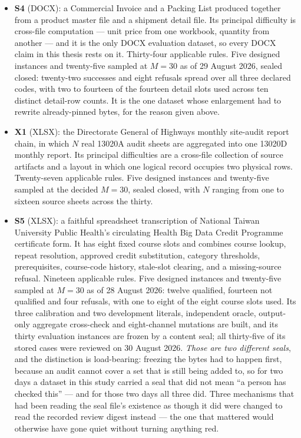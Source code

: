 \begin{itemize}
  \item \textbf{S4} (DOCX): a Commercial Invoice and a Packing List produced together from a
    product master file and a shipment detail file. Its principal difficulty is cross-file
    computation --- unit price from one workbook, quantity from another --- and it is the only
    DOCX evaluation dataset, so every DOCX claim in this thesis rests on it. Thirty-four
    applicable rules. Five designed instances and twenty-five sampled at $M=30$ as of
    29 August 2026, sealed closed: twenty-two successes and eight refusals spread over all
    three declared codes, with two to fourteen of the fourteen detail slots used across ten
    distinct detail-row counts. It is the one dataset whose enlargement had to rewrite
    already-pinned bytes, for the reason given above.
  \item \textbf{X1} (XLSX): the Directorate General of Highways monthly site-audit report
    chain, in which $N$ real 13020A audit sheets are aggregated into one 13020D monthly
    report. Its principal difficulties are a cross-file collection of source artifacts and a
    layout in which one logical record occupies two physical rows. Twenty-seven applicable
    rules. Five designed instances and twenty-five sampled at the decided $M=30$, sealed
    closed, with $N$ ranging from one to sixteen source sheets across the thirty.
  \item \textbf{S5} (XLSX): a faithful spreadsheet transcription of National
    Taiwan University Public Health's circulating Health Big Data Credit Programme
    certificate form. It has eight fixed course slots and combines course lookup, repeat
    resolution, approved credit substitution, category thresholds, prerequisites, course-code
    history, stale-slot clearing, and a missing-source refusal. Nineteen applicable rules.
    Five designed instances and twenty-five sampled at $M=30$ as of 28 August 2026: twelve
    qualified, fourteen not qualified and four refusals, with one to eight of the eight
    course slots used. Its three calibration and two development literals, independent
    oracle, output-only aggregate cross-check and eight-channel mutations are built, and its
    thirty evaluation instances are frozen by a content seal; all thirty-five of its stored
    cases were reviewed on 30 August 2026. \emph{Those are two different seals}, and
    the distinction is load-bearing: freezing the bytes had to happen first, because an audit
    cannot cover a set that is still being added to, so for two days a dataset in this study
    carried a seal that did not mean ``a person has checked this'' --- and for those two days
    all three did. Three mechanisms that had been reading the seal file's
    existence as though it did were changed to read the recorded review digest instead ---
    the one that mattered would otherwise have gone quiet without turning anything red.
\end{itemize}

